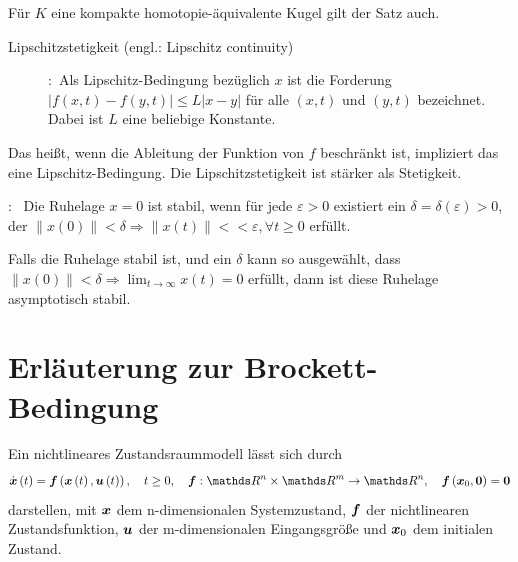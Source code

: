 \vspace{-0.8em}
Für $K$ eine kompakte homotopie-äquivalente Kugel gilt der Satz auch. 
\begin{Def}
	\begin{description}
		\item[Lipschitzstetigkeit (engl.: Lipschitz continuity)]
		\cite[S. 553]{bronstein2012taschenbuch}:~Als Lipschitz-Bedingung bezüglich $x$ ist die Forderung $\left | f\left ( x,t \right ) -f\left ( y,t \right )\right |\leq L\left | x-y \right |$ für alle $\left ( x,t \right )$ und $\left ( y,t \right )$ bezeichnet. Dabei ist $L$ eine beliebige Konstante.
	\end{description}
\end{Def}
\vspace{-0.8em}
Das heißt, wenn die Ableitung der Funktion von $f$ beschränkt ist, impliziert das eine Lipschitz-Bedingung. Die Lipschitzstetigkeit ist stärker als Stetigkeit.
\begin{Def}
	\begin{description}
		\label{Asymptotische_Stabilität}
		\item[Asymptotische Stabilität (engl.: asymptotically stable)] 
		\cite[S. 112]{khalil2002nonlinear}:~ Die Ruhelage $x=0$ ist stabil, wenn für jede $\varepsilon>0$ existiert ein $\delta = \delta(\varepsilon)>0$, der $\left \| x(0) \right \|<\delta \Rightarrow \left \| x(t) \right \|< <\varepsilon, $${\forall}$$ t\geq 0$ erfüllt.
		
		Falls die Ruhelage stabil ist, und ein $\delta$ kann so ausgewählt, dass $\left \| x(0) \right \|<\delta \Rightarrow \lim_{t\rightarrow \infty}x(t) = 0$ erfüllt, dann ist diese Ruhelage asymptotisch stabil.
	\end{description}
\end{Def}	







\section{Erläuterung zur Brockett-Bedingung}
\label{Erläuterung_zur_Brockett-Bedingung}
Ein nichtlineares Zustandsraummodell lässt sich durch
\begin{eqnarray}
\dot{\vect{x}}\left ( t \right )=\vect{f}\left (\vect{x}\left ( t \right ),\vect{u}\left ( t \right )  \right ),~~~t\geq 0,~~~\vect{f}:\Reals^{n}\times\Reals^{m}\to\Reals^{n},~~~\vect{f}\left ({\vect{x}_{0}},\vect{0}  \right )=\vect{0}
\label{eq:Zustandsraummodell}
\end{eqnarray}
darstellen, mit $\boldsymbol x$ dem n-dimensionalen Systemzustand, $\boldsymbol f$ der nichtlinearen Zustandsfunktion, $\boldsymbol u$ der m-dimensionalen Eingangsgröße und $\boldsymbol x_{0}$ dem initialen Zustand. 

